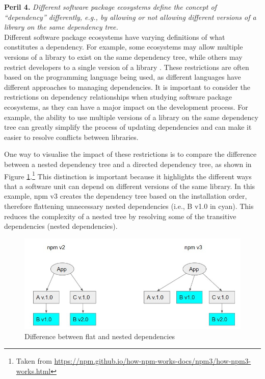 \smallskip\noindent\textbf{Peril 4.}\textit{
Different software package ecosystems define the concept of ``dependency'' differently, e.g., by allowing or not allowing different versions of a library on the same dependency tree.
}\\

Different software package ecosystems have varying definitions of what constitutes a dependency. For example, some ecosystems may allow multiple versions of a library to exist on the same dependency tree, while others may restrict developers to a single version of a library \cite{Islam}. These restrictions are often based on the programming language being used, as different languages have different approaches to managing dependencies. It is important to consider the restrictions on dependency relationships when studying software package ecosystems, as they can have a major impact on the development process. For example, the ability to use multiple versions of a library on the same dependency tree can greatly simplify the process of updating dependencies and can make it easier to resolve conflicts between libraries.

One way to visualise the impact of these restrictions is to compare the difference between a nested dependency tree and a directed dependency tree, as shown in Figure \ref{fig:nest}.\footnote{Taken from \url{https://npm.github.io/how-npm-works-docs/npm3/how-npm3-works.html}} This distinction is important because it highlights the different ways that a software unit can depend on different versions of the same library.
In this example, npm v3 creates the dependency tree based on the installation order, therefore flattening unnecessary nested dependencies (i.e., B v1.0 in cyan). This reduces the complexity of a nested tree by resolving some of the transitive dependencies (nested dependencies).

\begin{figure}
	\centering
	\includegraphics[width=.8\textwidth]{book/chapter-promisesandperils/pics/nestedv2.jpg}
	\caption{Difference between flat and nested dependencies}
	\label{fig:nest}
\end{figure}

